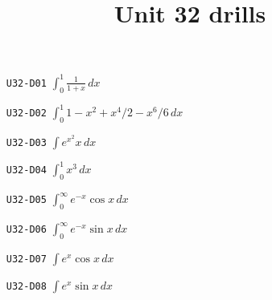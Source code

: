 \title{Unit 32 drills}\maketitle\begin{enumerate}
  \item[\texttt{U32-D01}] $\displaystyle \int_{0}^{1}\frac{1}{1+x}\,dx$
  \item[\texttt{U32-D02}] $\displaystyle \int_{0}^{1}1-x^{2}+x^{4}/2-x^{6}/6\,dx$
  \item[\texttt{U32-D03}] $\displaystyle \int e^{x^{2}}x\,dx$
  \item[\texttt{U32-D04}] $\displaystyle \int_{0}^{1}x^{3}\,dx$
  \item[\texttt{U32-D05}] $\displaystyle \int_{0}^{\infty}e^{-x}\cos x\,dx$
  \item[\texttt{U32-D06}] $\displaystyle \int_{0}^{\infty}e^{-x}\sin x\,dx$
  \item[\texttt{U32-D07}] $\displaystyle \int e^{x}\cos x\,dx$
  \item[\texttt{U32-D08}] $\displaystyle \int e^{x}\sin x\,dx$
\end{enumerate}
